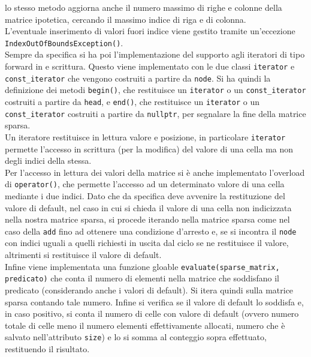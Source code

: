 \documentclass[a4paper,12pt, oneside]{article}
\begin{document}
lo stesso metodo aggiorna anche il numero massimo di righe e colonne
della matrice ipotetica, cercando il massimo indice di riga e di
colonna.
\\
L'eventuale inserimento di valori fuori indice viene gestito tramite
un'eccezione \texttt{IndexOutOfBoundsException()}.\\
Sempre da specifica si ha poi l'implementazione del supporto agli
iteratori di tipo forward in e scrittura. Questo viene implementato
con le due classi \texttt{iterator} e \texttt{const\_iterator} che
vengono costruiti a partire da \texttt{node}. Si ha quindi la
definizione dei metodi \texttt{begin()}, che restituisce un
\texttt{iterator} o un \texttt{const\_iterator} costruiti a partire da
\texttt{head}, e \texttt{end()}, che restituisce un
\texttt{iterator} o un \texttt{const\_iterator} costruiti a partire da
\texttt{nullptr}, per segnalare la fine della matrice sparsa. \\
Un iteratore restituisce in lettura valore e posizione, in particolare
\texttt{iterator} permette l'accesso in scrittura (per la modifica)
del valore di una cella ma non degli indici della stessa.\\
Per l'accesso in lettura dei valori della matrice si è anche
implementato l'overload di \texttt{operator()}, che permette l'accesso
ad un determinato valore di una cella mediante i due indici. Dato che
da specifica deve avvenire la restituzione del valore di default, nel
caso in cui si chieda il valore di una cella non indicizzata nella
nostra matrice sparsa, si procede iterando nella matrice sparsa come
nel caso della \texttt{add} fino ad ottenere una condizione d'arresto e, se
si incontra il \texttt{node} con indici uguali a quelli richiesti in
uscita dal ciclo se ne restituisce il valore, altrimenti si
restituisce il valore di default.\\
Infine viene implementata una funzione gloable
\texttt{evaluate(sparse\_matrix, predicato)} che conta il numero di
elementi nella matrice che soddisfano il predicato (considerando anche
i valori di default). Si itera quindi sulla matrice sparsa contando
tale numero. Infine si verifica se il valore di default lo soddisfa e,
in caso positivo, si conta il numero di celle con valore di
default (ovvero numero totale di celle meno il numero elementi
effettivamente allocati, numero che è salvato nell'attributo
\texttt{size}) e lo si somma al conteggio sopra effettuato,
restituendo il risultato.
\newpage
\end{document}
